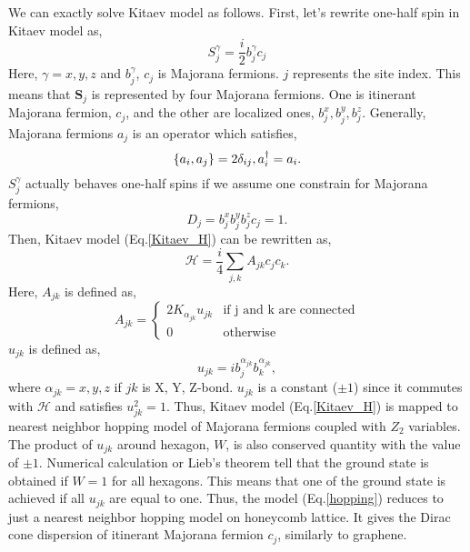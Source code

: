 \documentclass[a4,10.5pt]{report}
\begin{document}
We can exactly solve Kitaev model as follows.
First, let's rewrite one-half spin in Kitaev model as,
\begin{equation}
S^\gamma_j = \frac{i}{2}b^\gamma_jc_j
\end{equation}
Here, $\gamma = x,y,z$ and $b^\gamma_j$, $c_j$ is Majorana fermions.
$j$ represents the site index.
This means that $\bm{S}_j$ is represented by four Majorana fermions.
One is itinerant Majorana fermion, $c_j$, and the other are localized ones, $b^x_j, b^y_j, b^z_j$.
Generally, Majorana fermions $a_j$ is an operator which satisfies,
\begin{equation}
\{a_i, a_j\} = 2\delta_{ij}, \vspace{4mm} a^\dag_i = a_i.
\end{equation}
$S^\gamma_j$ actually behaves one-half spins if we assume one constrain for Majorana fermions,
\begin{equation}
D_j = b^x_jb^y_jb^z_jc_j = 1.
\end{equation}
Then, Kitaev model (Eq.\ref{Kitaev_H}) can be rewritten as,
\begin{equation}
\mathcal{H} = \frac{i}{4}\sum_{j,k}A_{jk}c_jc_k.
\label{hopping}
\end{equation}
Here, $A_{jk}$ is defined as,
\begin{equation}
A_{jk} = \begin{cases}
2K_{\alpha_{jk}}u_{jk} & \text{if j and k are connected}\\
0 & \text{otherwise}
\end{cases}
\end{equation}
$u_{jk}$ is defined as,
\begin{equation}
u_{jk} = ib^{\alpha_{jk}}_jb^{\alpha_{jk}}_k,
\end{equation}
where $\alpha_{jk} = x, y, z$ if $jk$ is X, Y, Z-bond. 
$u_{jk}$ is a constant ($\pm 1$) since it commutes with $\mathcal{H}$ and satisfies $u^2_{jk} = 1$.
Thus, Kitaev model (Eq.\ref{Kitaev_H}) is mapped to nearest neighbor hopping model of Majorana fermions coupled with $Z_2$ variables.
The product of $u_{jk}$ around hexagon, $W$, is also conserved quantity with the value of $\pm1$.
Numerical calculation or Lieb's theorem \cite{kitaev2006anyons} tell that the ground state is obtained if $W = 1$ for all hexagons.
This means that one of the ground state is achieved if all $u_{jk}$ are equal to one.
Thus, the model (Eq.\ref{hopping}) reduces to just a nearest neighbor hopping model on honeycomb lattice. 
It gives the Dirac cone dispersion of itinerant Majorana fermion $c_j$, similarly to graphene.
\end{document}
